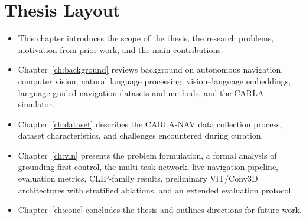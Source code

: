\section{Thesis Layout}

\begin{itemize}
    \item[C1] This chapter introduces the scope of the thesis, the research problems, motivation from prior work, and the main contributions.
    \item[C2] Chapter~\ref{ch:background} reviews background on autonomous navigation, computer vision, natural language processing, vision--language embeddings, language-guided navigation datasets and methods, and the CARLA simulator.
    \item[C3] Chapter~\ref{ch:dataset} describes the CARLA-NAV data collection process, dataset characteristics, and challenges encountered during curation.
    \item[C4] Chapter~\ref{ch:vln} presents the problem formulation, a formal analysis of grounding-first control, the multi-task network, live-navigation pipeline, evaluation metrics, CLIP-family results, preliminary ViT/Conv3D architectures with stratified ablations, and an extended evaluation protocol.
    \item[C5] Chapter~\ref{ch:conc} concludes the thesis and outlines directions for future work.
\end{itemize}
